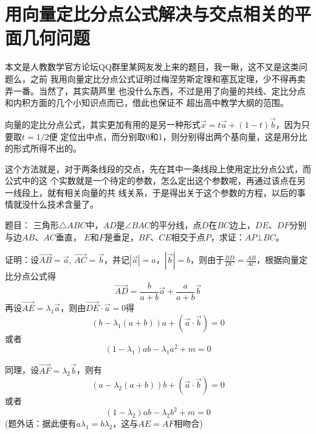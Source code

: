 
\section{用向量定比分点公式解决与交点相关的平面几何问题}
\label{sec:vector-geometry}

本文是人教数学官方论坛QQ群里某网友发上来的题目，我一瞅，这不又是这类问题么，之前 我用向量定比分点公式证明过梅涅劳斯定理和塞瓦定理，少不得再卖弄一番。当然了，其实葫芦里 也没什么东西，不过是用了向量的共线、定比分点和内积方面的几个小知识点而已，借此也保证不 超出高中教学大纲的范围。

向量的定比分点公式，其实更加有用的是另一种形式$\vec{x} = t \vec{a} + (1 - t) \vec{b}$，因为只要取$t = 1 / 2$便 定位出中点，而分别取0和1，则分别得出两个基向量，这是用分比的形式所得不出的。

这个方法就是，对于两条线段的交点，先在其中一条线段上使用定比分点公式，而公式中的这 个实数就是一个待定的参数，怎么定出这个参数呢，再通过该点在另一线段上，就有相关向量的共 线关系，于是得出关于这个参数的方程，以后的事情就没什么技术含量了。

题目： 三角形$\triangle A B C$中，$A D$是$\angle B A C$的平分线，点$D$在$B C$边上，$D E$、$D F$分别与边$A B$、$A C$垂直， $E$和$F$是垂足，$B F$、$C E$相交于点$P$，求证：$A P \bot B C$。

证明：设$\overrightarrow{A B} = \vec{a}$, $\overrightarrow{A C} = \vec{b}$，并记$| \vec{a} | = a$，$| \vec{b} | = b$，则由于$\frac{B D}{D C} = \frac{A B}{A C}$，根据向量定比分点公式得 
\begin{equation}
\overrightarrow{A D} = \frac{b}{a + b} \vec{a} + \frac{a}{a + b} \vec{b}
\end{equation}
 再设$\overrightarrow{A E} = \lambda_1 \vec{a}$，则由$\overrightarrow{D E} \cdot \vec{a} = 0$得
 \begin{equation}
   \label{eq:vector-geometry-lambda-1}
(b - \lambda_1 (a + b)) a + (\vec{a} \cdot \vec{b}) = 0 
 \end{equation}
或者
\begin{equation}
  \label{eq:vector-geometry-lambda-1-1}
(1 - \lambda_1) a b - \lambda_1 a^2 + m = 0
\end{equation}

同理，设$\overrightarrow{A F} = \lambda_2 \vec{b}$，则有
\begin{equation}
  \label{eq:vector-geometry-lambda-2}
(a - \lambda_2 (a + b)) b + (\vec{a} \cdot \vec{b}) = 0
\end{equation}
或者
\begin{equation}
  \label{eq:vector-geometry-lambda-2-1}
(1 - \lambda_2) a b - \lambda_2 b^2 + m = 0
\end{equation}
(题外话：据此便有$a \lambda_1 = b \lambda_2$，这与$A E = A F$相吻合)

